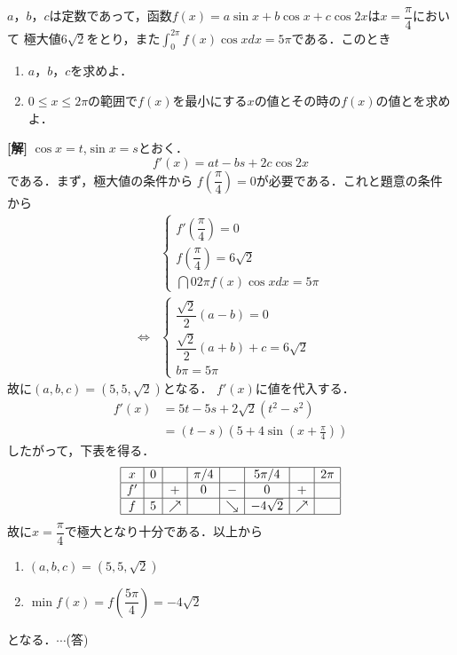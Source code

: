 \documentclass[a4paper,10pt]{ltjsarticle}
\begin{document}

\begin{oframed}
$a$，$b$，$c$は定数であって，函数$f(x)=a\sin x+b\cos x+c\cos 2x$は$x=\dfrac{\pi}{4}$において
極大値$6\sqrt{2}$をとり，また$\int_0^{2\pi} f(x)\cos x dx=5\pi$である．このとき
\begin{enumerate}[(1)]
\item $a$，$b$，$c$を求めよ．
\item $0\le x\le 2\pi$の範囲で$f(x)$を最小にする$x$の値とその時の$f(x)$の値とを求めよ．
\end{enumerate}
\end{oframed}
\setlength{\columnseprule}{0.4pt}
\begin{multicols}{2}
{\bf[解]}
     $\cos x=t$,$\sin x=s$とおく．
     \[f'(x)=at-bs+2c\cos 2x\]
     である．まず，極大値の条件から
     $f\left(\dfrac{\pi}{4}\right)=0$が必要である．これと題意の条件から
          \begin{align*}
          &\left\{
               \begin{array}{l}
               f'\left(\dfrac{\pi}{4}\right)=0 \\
               f\left(\dfrac{\pi}{4}\right)=6\sqrt{2} \\
               \dint{0}{2\pi}f(x)\cos x dx=5\pi 
               \end{array}
          \right.  \\
          \Leftrightarrow
          &\left\{
               \begin{array}{l}
               \dfrac{\sqrt{2}}{2}(a-b)=0 \\
               \dfrac{\sqrt{2}}{2}(a+b)+c=6\sqrt{2} \\
               b\pi=5\pi 
               \end{array}
         \right.
         \end{align*}
    故に$(a,b,c)=(5,5,\sqrt{2})$となる．
      $f'(x)$に値を代入する．
          \begin{align*}
          f'(x)&=5t-5s+2\sqrt{2}(t^2-s^2) \\
          &=(t-s)\left(5+4\sin\left(x+\frac{\pi}{4}\right)\right)
          \end{align*}
     したがって，下表を得る．
      \begin{align*}
     \begin{array}{|c|c|c|c|c|c|c|c|} \hline
     x & 0 &    &  \pi/4&     &5\pi/4            &     &2\pi  \\ \hline
     f' &    &+  & 0      & -    & 0                 &+   &        \\ \hline
     f &  5 &\nearrow&        &\searrow &-4\sqrt{2}      &\nearrow&        \\ \hline
     \end{array}
     \end{align*}
     故に$x=\dfrac{\pi}{4}$で極大となり十分である．以上から
     \begin{enumerate}[(1)]
     \item $(a,b,c)=(5,5,\sqrt{2})$ 
     \item $\min f(x)=f\left(\dfrac{5\pi}{4}\right)=-4\sqrt{2}$ 
     \end{enumerate}
     となる．$\cdots$(答)
          \newpage
\end{multicols}
\end{document}
